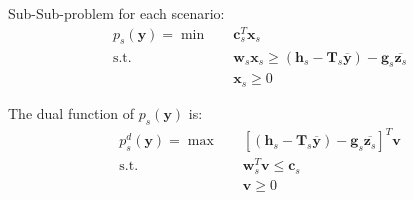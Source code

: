 \documentclass[fleqn,10pt]{wlscirep}
\begin{document}
Sub-Sub-problem for each scenario:
\begin{align}
    p_s(\mathbf{y}) = \min \quad & \mathbf{c}_s^T \mathbf{x}_s \\
    \text{s.t.} \quad & \mathbf{w}_s \mathbf{x}_s \geq \left(\mathbf{h}_s - \mathbf{T}_s \overline{\mathbf{y}} \right) - \mathbf{g}_s \overline{\mathbf{z}_s}  \\
    & \mathbf{x}_s \geq 0
\end{align}

The dual function of $p_s(\mathbf{y})$ is:
\begin{align}
    p_s^d(\mathbf{y}) = \max \quad & \left[\left(\mathbf{h}_s - \mathbf{T}_s \overline{\mathbf{y}} \right) - \mathbf{g}_s \overline{\mathbf{z}_s} \right]^{T} \mathbf{v} \\
    \text{s.t.} \quad & \mathbf{w}_s^{T} \mathbf{v} \leq \mathbf{c}_s \\
    & \mathbf{v} \geq 0
\end{align}
\end{document}
